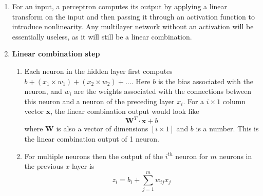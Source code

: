 \documentclass{article}
\begin{document}
\begin{enumerate}
    \item For an input, a perceptron computes its output by applying a linear transform on the input and then passing it through an activation function to introduce nonlinearity. Any multilayer network without an activation will be essentially useless, as it will still be a linear combination. 
    \item \textbf{Linear combination step} 
    \begin{enumerate}
        \item Each neuron in the hidden layer first computes $b+ (x_1\times w_1)+ (x_2\times w_2)+...$. Here $b$ is the bias associated with the neuron, and $w_i$ are the weights associated with the connections between this neuron and a neuron of the preceding layer $x_i$. For a $i\times 1$ column vector $\textbf{x}$, the linear combination output would look like \[ \textbf{W}^T\cdot\textbf{x}+b\] where \textbf{W} is also a vector of dimensions $[i\times 1]$ and $b$ is a number. This is the linear combination output of 1 neuron.
        \item For multiple neurons then the output of the $i^{th}$ neuron for $m$ neurons in the previous $x$ layer is \[z_i = b_{i}+\sum_{j=1}^m w_{ij} x_j\]
    
    \begin{center}
        
\end{center}
\end{enumerate}
\end{enumerate}
\end{document}
